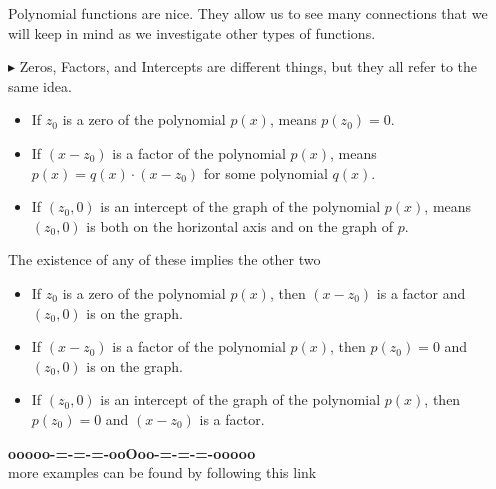 \documentclass{ximera}
\begin{document}
Polynomial functions are nice.  They allow us to see many connections that we will keep in mind as we investigate other types of functions.


\textbf{\textcolor{red!70!darkgray}{$\blacktriangleright$}} Zeros, Factors, and Intercepts are different things, but they all refer to the same idea.





\begin{itemize}

\item If $z_0$ is a zero of the polynomial $p(x)$, means $p(z_0)=0$.


\item If $(x-z_0)$ is a factor of the polynomial $p(x)$, means $p(x) = q(x) \cdot (x-z_0)$ for some polynomial $q(x)$.


\item If $(z_0,0)$ is an intercept of the graph of the polynomial $p(x)$, means $(z_0,0)$ is both on the horizontal axis and on the graph of $p$.

\end{itemize}


The existence of any of these implies the other two






\begin{itemize}

\item If $z_0$ is a zero of the polynomial $p(x)$, then $(x-z_0)$ is a factor and $(z_0,0)$ is on the graph.


\item If $(x-z_0)$ is a factor of the polynomial $p(x)$, then $p(z_0)=0$ and $(z_0,0)$ is on the graph.


\item If $(z_0,0)$ is an intercept of the graph of the polynomial $p(x)$, then $p(z_0)=0$ and $(x-z_0)$ is a factor.

\end{itemize}















\begin{onlineOnly}
\begin{center}
\textbf{\textcolor{green!50!black}{ooooo-=-=-=-ooOoo-=-=-=-ooooo}} \\

more examples can be found by following this link\\ 

\end{center}
\end{onlineOnly}
\end{document}
